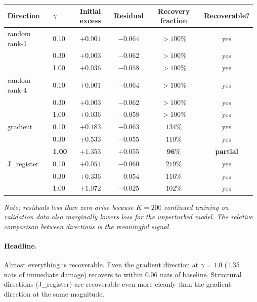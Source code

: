 \documentclass[11pt, a4paper]{article}
\theoremstyle{plain}
\theoremstyle{definition}
\theoremstyle{remark}
\begin{document}
\begin{center}
\small
\begin{tabular}{l l c c c c}
\toprule
Direction & $\gamma$ & Initial excess & Residual & Recovery fraction & Recoverable? \\
\midrule
random rank-1 & 0.10 & $+0.001$  & $-0.064$ & ${>}100\%$ & yes \\
              & 0.30 & $+0.003$  & $-0.062$ & ${>}100\%$ & yes \\
              & 1.00 & $+0.036$  & $-0.058$ & ${>}100\%$ & yes \\
random rank-4 & 0.10 & $+0.001$  & $-0.064$ & ${>}100\%$ & yes \\
              & 0.30 & $+0.003$  & $-0.062$ & ${>}100\%$ & yes \\
              & 1.00 & $+0.036$  & $-0.058$ & ${>}100\%$ & yes \\
gradient      & 0.10 & $+0.183$  & $-0.063$ & $134\%$  & yes \\
              & 0.30 & $+0.533$  & $-0.055$ & $110\%$  & yes \\
              & \textbf{1.00} & $+1.353$  & $\mathbf{+0.055}$ & $\mathbf{96\%}$  & \textbf{partial} \\
J\_register   & 0.10 & $+0.051$  & $-0.060$ & $219\%$  & yes \\
              & 0.30 & $+0.336$  & $-0.054$ & $116\%$  & yes \\
              & 1.00 & $+1.072$  & $-0.025$ & $102\%$  & yes \\
\bottomrule
\end{tabular}
\end{center}
\textit{Note: residuals less than zero arise because $K=200$ continued training on validation data also marginally lowers loss for the unperturbed model. The relative comparison between directions is the meaningful signal.}

\paragraph{Headline.} Almost everything is recoverable.
Even the gradient direction at $\gamma = 1.0$ (1.35 nats of immediate damage) recovers to within $0.06$ nats of baseline.
Structural directions (J\_register) are recoverable even more cleanly than the gradient direction at the same magnitude.
\end{document}
